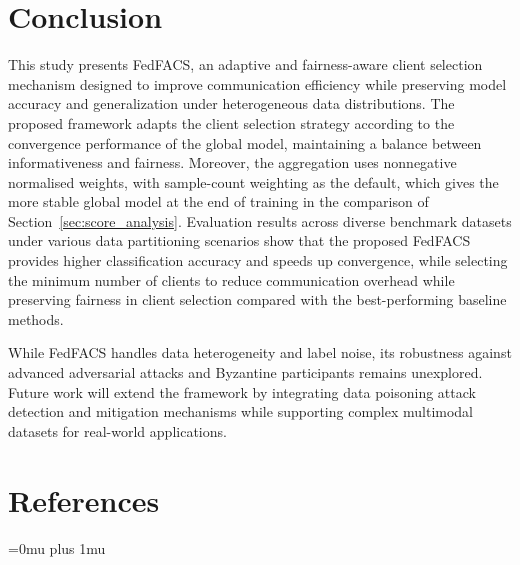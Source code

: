\documentclass[pdflatex,sn-mathphys-num,oneside]{sn-jnl}%
\theoremstyle{thmstyleone}%
\theoremstyle{thmstyletwo}%
\theoremstyle{thmstylethree}%
\begin{document}
\section{Conclusion}
\label{sec:conclusion}

This study presents FedFACS, an adaptive and fairness-aware client selection mechanism designed to improve communication efficiency while preserving model accuracy and generalization under heterogeneous data distributions. The proposed framework adapts the client selection strategy according to the convergence performance of the global model, maintaining a balance between informativeness and fairness. Moreover, the aggregation uses nonnegative normalised weights, with sample-count weighting as the default, which gives the more stable global model at the end of training in the comparison of Section~\ref{sec:score_analysis}. Evaluation results across diverse benchmark datasets under various data partitioning scenarios show that the proposed FedFACS provides higher classification accuracy and speeds up convergence, while selecting the minimum number of clients to reduce communication overhead while preserving fairness in client selection compared with the best-performing baseline methods.

While FedFACS handles data heterogeneity and label noise, its robustness against advanced adversarial attacks and Byzantine participants remains unexplored. Future work will extend the framework by integrating data poisoning attack detection and mitigation mechanisms while supporting complex multimodal datasets for real-world applications.

\FloatBarrier
\backmatter


\section{References}

\begingroup
\small
\setlength{\emergencystretch}{2em}
\setlength{\parindent}{0pt}
\setlength{\parskip}{0pt}
\setlength{\leftskip}{0pt}
\setlength{\rightskip}{0pt}
\Urlmuskip=0mu plus 1mu\relax
\renewcommand{\section}[2]{}
\end{document}
